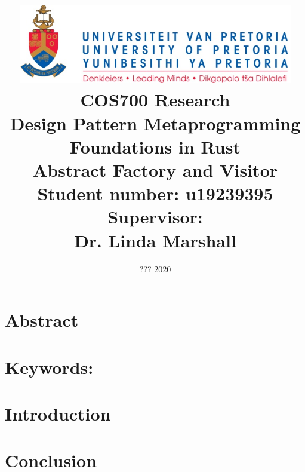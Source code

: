 \documentclass[a4paper,10pt]{article}
\title
{
   \includegraphics[width=12cm]{up_logo.png} \\
   \vspace{2cm}
   \textbf{COS700 Research} \\ \vspace{0.5cm}
   \textbf{Design Pattern Metaprogramming Foundations in Rust\\ \large Abstract Factory and Visitor} \\ \vspace{0.5cm}
   \textbf{Student number:} u19239395 \\ \vspace{0.5cm}
   \textbf{Supervisor}: \\ Dr. Linda Marshall
}
\date{??? 2020}
\begin{document}
\author{}

\maketitle

\newpage
\linespread{1.25}

\section*{Abstract}

\section*{Keywords:}

\newpage

\section{Introduction}



\section{Conclusion}




\end{document}

